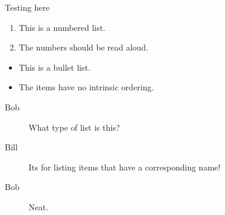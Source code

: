 \documentclass{article}
\begin{document}
Testing here

\begin{enumerate}
    \item This is a numbered list.
    \item The numbers should be read aloud.
\end{enumerate}
\begin{itemize}
    \item This is a bullet list.
    \item The items have no intrinsic ordering.
\end{itemize}
\begin{description}
    \item[Bob] What type of list is this?
    \item[Bill] Its for listing items that have a corresponding name!
    \item[Bob] Neat.
\end{description}
\end{document}
